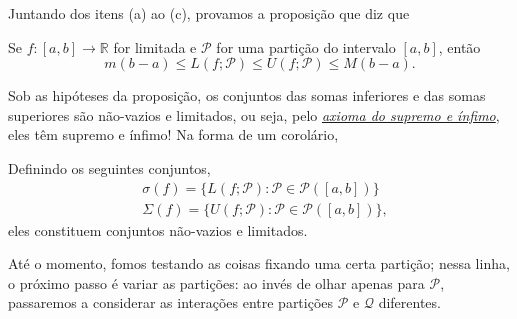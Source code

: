 \documentclass[../analysisII_notes.tex]{subfiles}
\begin{document}
Juntando dos itens (a) ao (c), provamos a proposição que diz que
\begin{prop*}
	Se \(f:[a, b]\rightarrow \mathbb{R}\) for limitada e \(\mathcal{P}\) for uma partição do intervalo \([a, b]\), então
	\[
		m(b-a)\leq L(f; \mathcal{P}) \leq U(f; \mathcal{P}) \leq M(b-a).
	\]
\end{prop*}

Sob as hipóteses da proposição, os conjuntos das somas inferiores e das somas superiores são não-vazios e limitados, ou seja, pelo \hyperlink{lub_property}{\textit{axioma do supremo e ínfimo}}, eles têm supremo e ínfimo! Na forma de um corolário,
\begin{crl*}
	Definindo os seguintes conjuntos,
	\begin{align*}
		 & \sigma (f) = \{L(f; \mathcal{P}): \mathcal{P}\in \mathcal{P}([a, b])\}  \\
		 & \Sigma (f) = \{U(f; \mathcal{P}): \mathcal{P}\in \mathcal{P}([a, b])\},
	\end{align*}
	eles constituem conjuntos não-vazios e limitados.
\end{crl*}

Até o momento, fomos testando as coisas fixando uma certa partição; nessa linha, o próximo passo é variar as partições: ao invés de olhar apenas para \(\mathcal{P}\), passaremos a considerar as interações entre partições \(\mathcal{P}\) e \(\mathcal{Q}\) diferentes.
\end{document}
